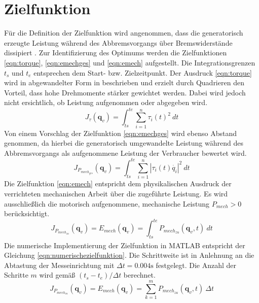 \section{Zielfunktion}
Für die Definition der Zielfunktion wird angenommen, dass die generatorisch erzeugte Leistung während des Abbremsvorgangs über Bremswiderstände dissipiert \cite[S.~1327]{Pellicciari.2015}. Zur Identifizierung des Optimums werden die Zielfunktionen \ref{eqn:torque}, \ref{eqn:emechges} \cite[S.~1216]{Saravanan.2008} und \ref{eqn:emech} \cite[S.~57]{Eggers.2019} aufgestellt. Die Integrationsgrenzen $t_s$ und $t_e$ entsprechen dem Start- bzw. Zielzeitpunkt. Der Ausdruck \ref{eqn:torque} wird in abgewandelter Form in \cite[S-~1]{Hansen.2012} beschrieben und erzielt durch Quadrieren den Vorteil, dass hohe Drehmomente stärker gewichtet werden. Dabei wird jedoch nicht ersichtlich, ob Leistung aufgenommen oder abgegeben wird.
%
\begin{equation}
	\label{eqn:torque}
	J_{\tau}(\bm{q}_{v}) = \int_{ts}^{te}\sum_{i=1}^{n}\tau_i(t)^2~dt
\end{equation}
%
Von einem Vorschlag der Zielfunktion \ref{eqn:emechges} wird ebenso Abstand genommen, da hierbei die generatorisch umgewandelte Leistung während des Abbremsvorgangs als aufgenommene Leistung der Verbraucher bewertet wird. 
%
\begin{equation}
	\label{eqn:emechges}
	J_{P_{mech_{ges}}}(\bm{q}_{v}) = \int_{ts}^{te}\sum_{i=1}^{n}\left|\tau_i(t)\dot{q_i}\right|^2~dt
\end{equation}
%
Die Zielfunktion \ref{eqn:emech} entspricht dem physikalischen Ausdruck der verrichteten mechanischen Arbeit über die zugeführte Leistung. Es wird ausschließlich die motorisch aufgenommene, mechanische Leistung $P_{mech}>0$ berücksichtigt. 
%
\begin{equation}
	\label{eqn:emech}
	J_{P_{mech_{zu}}}
	(\bm{q}_{v}) 
	= E_{mech}(\bm{q}_{v}) 
	=\int_{ts}^{te}P_{mech_{zu}}(\bm{q}_{v},t)~dt
\end{equation}
%
Die numerische Implementierung der Zielfunktion in  MATLAB\textsuperscript{\textregistered} entspricht der Gleichung  \ref{eqn:numerischezielfunktion}. Die Schrittweite ist in Anlehnung an die Abtastung der Messeinrichtung  mit $\Delta t = 0.004 \text{s}$ festgelegt. Die Anzahl der Schritte $m$  wird gemäß $(t_s-t_e)/\Delta t$ berechnet.
%
\begin{equation}
	\label{eqn:numerischezielfunktion}
	J_{P_{mech_{zu}}}
	(\bm{q}_{v}) 
	= E_{mech}(\bm{q}_{v}) 
	= \sum_{k=1}^{m} P_{mech_{zu}}(\bm{q}_{v},t)~\Delta t
\end{equation}
%

